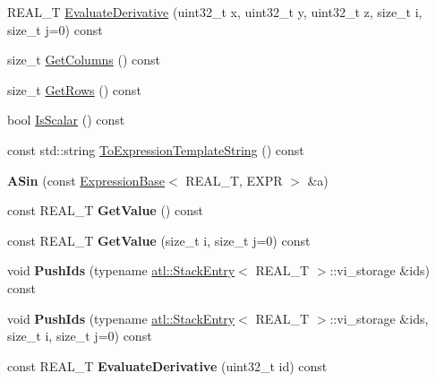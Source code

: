 \begin{DoxyCompactItemize}
R\+E\+A\+L\+\_\+\+T \hyperlink{structatl_1_1_a_sin_ae6ef55e7cb8cad6613c278d4acd9e9a5}{Evaluate\+Derivative} (uint32\+\_\+t x, uint32\+\_\+t y, uint32\+\_\+t z, size\+\_\+t i, size\+\_\+t j=0) const 
\item 
size\+\_\+t \hyperlink{structatl_1_1_a_sin_ac543bb3714f66197d82872d95597c4fa}{Get\+Columns} () const 
\item 
size\+\_\+t \hyperlink{structatl_1_1_a_sin_ad81c947c1c246f0b8632c4a76b6abd25}{Get\+Rows} () const 
\item 
bool \hyperlink{structatl_1_1_a_sin_a08317f212ec6e8ee67dff39c5a50dc65}{Is\+Scalar} () const 
\item 
const std\+::string \hyperlink{structatl_1_1_a_sin_a9aead25825a033a090f9f6251d87ba12}{To\+Expression\+Template\+String} () const 
\item 
\hypertarget{structatl_1_1_a_sin_a78dd6e912643cfb931c91b0cdcd86775}{{\bfseries A\+Sin} (const \hyperlink{structatl_1_1_expression_base}{Expression\+Base}$<$ R\+E\+A\+L\+\_\+\+T, E\+X\+P\+R $>$ \&a)}\label{structatl_1_1_a_sin_a78dd6e912643cfb931c91b0cdcd86775}

\item 
\hypertarget{structatl_1_1_a_sin_a735c2c1455ac56357b45891d6e1e89e9}{const R\+E\+A\+L\+\_\+\+T {\bfseries Get\+Value} () const }\label{structatl_1_1_a_sin_a735c2c1455ac56357b45891d6e1e89e9}

\item 
\hypertarget{structatl_1_1_a_sin_a3495a8c2cfae3128fb661f70d4a81f66}{const R\+E\+A\+L\+\_\+\+T {\bfseries Get\+Value} (size\+\_\+t i, size\+\_\+t j=0) const }\label{structatl_1_1_a_sin_a3495a8c2cfae3128fb661f70d4a81f66}

\item 
\hypertarget{structatl_1_1_a_sin_a9ce7699eb3a349c5aef84ae5b300571e}{void {\bfseries Push\+Ids} (typename \hyperlink{structatl_1_1_stack_entry}{atl\+::\+Stack\+Entry}$<$ R\+E\+A\+L\+\_\+\+T $>$\+::vi\+\_\+storage \&ids) const }\label{structatl_1_1_a_sin_a9ce7699eb3a349c5aef84ae5b300571e}

\item 
\hypertarget{structatl_1_1_a_sin_a87876d1ff74017c2db8fb4f83dc6f812}{void {\bfseries Push\+Ids} (typename \hyperlink{structatl_1_1_stack_entry}{atl\+::\+Stack\+Entry}$<$ R\+E\+A\+L\+\_\+\+T $>$\+::vi\+\_\+storage \&ids, size\+\_\+t i, size\+\_\+t j=0) const }\label{structatl_1_1_a_sin_a87876d1ff74017c2db8fb4f83dc6f812}

\item 
\hypertarget{structatl_1_1_a_sin_af850f9d56fe01515d9d3160634ea0b97}{const R\+E\+A\+L\+\_\+\+T {\bfseries Evaluate\+Derivative} (uint32\+\_\+t id) const }\label{structatl_1_1_a_sin_af850f9d56fe01515d9d3160634ea0b97}


\end{DoxyCompactItemize}
